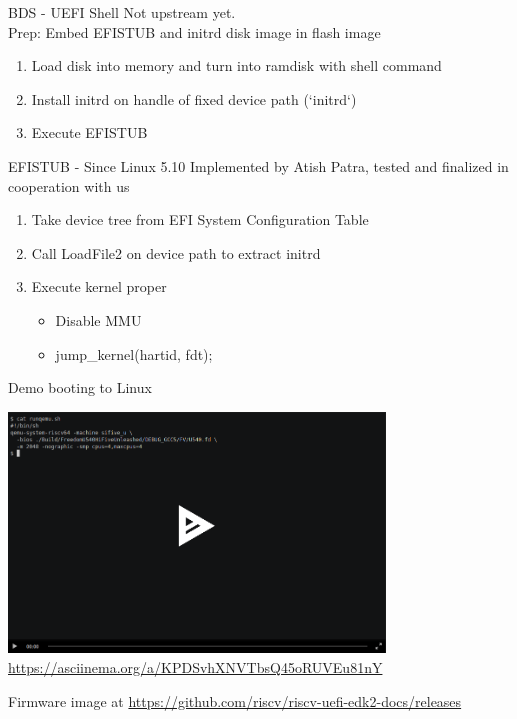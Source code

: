 \documentclass[
  10pt
]{beamer}
\begin{document}
\begin{frame}{BDS - UEFI Shell}
  Not upstream yet. \\
  Prep: Embed EFISTUB and initrd disk image in flash image

  \vfill

  \begin{enumerate}
    \item Load disk into memory and turn into ramdisk with shell command
    \item Install initrd on handle of fixed device path (`initrd`)
    \item Execute EFISTUB
  \end{enumerate}
\end{frame}

\begin{frame}{EFISTUB - Since Linux 5.10}
  Implemented by Atish Patra, tested and finalized in cooperation with us

  \vfill

  \begin{enumerate}
    \item Take device tree from EFI System Configuration Table
    \item Call LoadFile2 on device path to extract initrd
    \item Execute kernel proper
    \begin{itemize}
      \item Disable MMU
      \item jump\_kernel(hartid, fdt);
    \end{itemize}
  \end{enumerate}
\end{frame}

\begin{frame}{Demo booting to Linux}

  \begin{center}
     \includegraphics[width=0.75\textwidth]{resources/asciinema.png}
    \href{https://asciinema.org/a/KPDSvhXNVTbsQ45oRUVEu81nY}{https://asciinema.org/a/KPDSvhXNVTbsQ45oRUVEu81nY}
  \end{center}

  \tiny{Firmware image at \href{https://github.com/riscv/riscv-uefi-edk2-docs/releases}{https://github.com/riscv/riscv-uefi-edk2-docs/releases}}

\end{frame}
\end{document}
